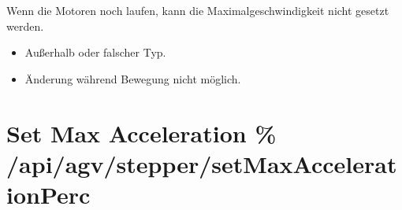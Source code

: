 \documentclass[letterpaper,10pt,english]{sphinxmanual}
\begin{document}
\sphinxAtStartPar
{}
Wenn die Motoren noch laufen, kann die Maximalgeschwindigkeit nicht gesetzt werden.

\sphinxAtStartPar
{}

\begin{sphinxVerbatim}[commandchars=\\\{\}]
\end{sphinxVerbatim}

\sphinxAtStartPar
{}

\begin{sphinxVerbatim}[commandchars=\\\{\}]
\end{sphinxVerbatim}

\sphinxAtStartPar
{}
\begin{itemize}
\item {} 
\sphinxAtStartPar
{} \textendash{} Außerhalb \sphinxcode{\sphinxupquote{{[}0.0, 100.0{]}}} oder falscher Typ.

\item {} 
\sphinxAtStartPar
{} \textendash{} Änderung während Bewegung nicht möglich.

\end{itemize}


\section{Set Max Acceleration \% \textendash{} /api/agv/stepper/setMaxAccelerationPerc}
\label{\detokenize{agv_rest_api_stepper:set-max-acceleration-api-agv-stepper-setmaxaccelerationperc}}\label{\detokenize{agv_rest_api_stepper:post-api-agv-stepper-setmaxaccelerationperc}}
\end{document}
